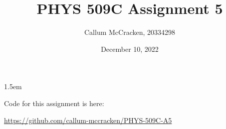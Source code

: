 \documentclass[11pt,letterpaper]{article}
\newcommand{\0}{\mathcal{O}}
\begin{document}
\thispagestyle{fancyplain}
\headheight 35pt
\author{Callum McCracken, 20334298}
\title{PHYS 509C Assignment 5}
\date{December 10, 2022}
\rfoot{\small\thepage}
\headsep 1.5em

\maketitle
\Large{Code for this assignment is here:

\url{https://github.com/callum-mccracken/PHYS-509C-A5}}

\newpage

\newpage

\newpage

\end{document}
